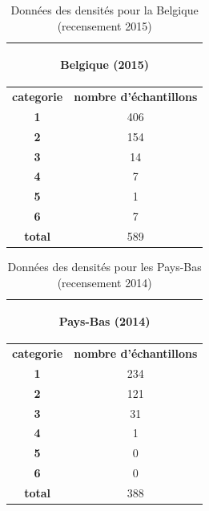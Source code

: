 \documentclass{book}
\begin{document}
   \begin{table}[H]
   \begin{center}
   \begin{adjustbox}{max width=0.5\textwidth}
    \begin{tabular}{|c|c|}
      \hline
      \multicolumn{2}{|c|}{\begin{bf}Belgique (2015)\end{bf}} \\
      \hline
      \textbf{categorie} & \textbf{nombre d'échantillons}\\
      \hline
      \textbf{1} & 406\\
      \hline
      \textbf{2} & 154\\
      \hline
      \textbf{3} & 14\\
      \hline
      \textbf{4} & 7\\
      \hline
      \textbf{5} & 1\\
      \hline
      \textbf{6} & 7\\
      \hline
      \textbf{total} & 589\\
      \hline
    \end{tabular}
   \end{adjustbox}
   \caption{Données des densités pour la Belgique (recensement 2015)}
   \label{belgique_data}
   \end{center}
   \end{table}

   \begin{table}[H]
   \begin{center}
   \begin{adjustbox}{max width=0.5\textwidth}
    \begin{tabular}{|c|c|}
      \hline
      \multicolumn{2}{|c|}{\begin{bf}Pays-Bas (2014)\end{bf}} \\
      \hline
      \textbf{categorie} & \textbf{nombre d'échantillons}\\
      \hline
      \textbf{1} & 234\\
      \hline
      \textbf{2} & 121\\
      \hline
      \textbf{3} & 31\\
      \hline
      \textbf{4} & 1\\
      \hline
      \textbf{5} & 0\\
      \hline
      \textbf{6} & 0 \\
      \hline
      \textbf{total} & 388\\
      \hline
    \end{tabular}
   \end{adjustbox}
   \caption{Données des densités pour les Pays-Bas (recensement 2014)}
   \label{pays-bas_data}
   \end{center}
   \end{table}
   
\end{document}
